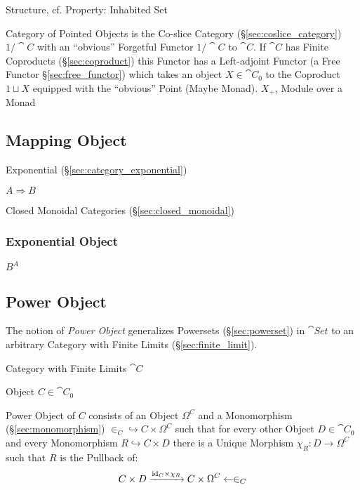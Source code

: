 Structure, cf. Property: Inhabited Set %

Category of Pointed Objects is the Co-slice Category
(\S\ref{sec:coslice_category}) $1/\cat{C}$ with an ``obvious'' Forgetful
Functor $1 / \cat{C}$ to $\cat{C}$. If $\cat{C}$ has Finite Coproducts
(\S\ref{sec:coproduct}) this Functor has a Left-adjoint Functor (a Free Functor
\S\ref{sec:free_functor}) which takes an object $X \in \cat{C}_0$ to the
Coproduct $1 \sqcup X$ equipped with the ``obvious'' Point (Maybe Monad).
$X_+$, Module over a Monad %



\subsection{Mapping Object}\label{sec:mapping_object}

Exponential (\S\ref{sec:category_exponential})

$A \Rightarrow B$

Closed Monoidal Categories (\S\ref{sec:closed_monoidal})



\subsubsection{Exponential Object}\label{sec:exponential_object}

$B^A$



\subsection{Power Object}\label{sec:power_object}

The notion of \emph{Power Object} generalizes Powersets
(\S\ref{sec:powerset}) in $\cat{Set}$ to an arbitrary Category with
Finite Limits (\S\ref{sec:finite_limit}).

Category with Finite Limits $\cat{C}$

Object $C \in \cat{C}_0$

Power Object of $C$ consists of an Object $\Omega^C$ and a
Monomorphism (\S\ref{sec:monomorphism}) $\in_C \hookrightarrow C
\times \Omega^C$ such that for every other Object $D \in \cat{C}_0$
and every Monomorphism $R \hookrightarrow C \times D$ there is a
Unique Morphism $\chi_R : D \rightarrow \Omega^C$ such that $R$ is the
Pullback of:
\[
  C \times D \xrightarrow{\mathrm{id}_C \times \chi_R} C \times \Omega^C
    \leftarrow \in_C
\]

